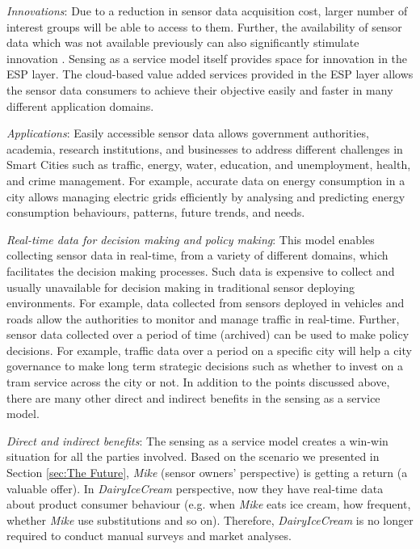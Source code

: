 \documentclass[times]{ettauth}
\begin{document}
\item  \textit{Innovations}: Due to a reduction in sensor data acquisition cost, larger number of interest groups will be able to access to them. Further, the availability of sensor data which was not available previously can also significantly stimulate innovation . Sensing as a service model itself provides space for innovation in the ESP layer. The cloud-based value added services provided in the ESP layer allows the sensor data consumers to achieve their objective easily and faster in many different application domains. 



\item  \textit{Applications}: Easily accessible sensor data allows government authorities, academia, research institutions, and businesses to address different challenges in Smart Cities such as traffic, energy, water, education, and unemployment, health, and crime management. For example, accurate data on energy consumption in a city allows managing electric grids efficiently by analysing and predicting energy consumption behaviours, patterns, future trends, and needs.


\item  \textit{Real-time data for decision making and policy making}: This model enables collecting sensor data in real-time, from a variety of different domains, which facilitates the decision making processes. Such data is expensive to collect and usually unavailable for decision making in traditional sensor deploying environments. For example, data collected from sensors deployed in vehicles and roads allow the authorities to monitor and manage traffic in real-time. Further, sensor data collected over a period of time (archived) can be used to make policy decisions. For example, traffic data over a period on a specific city will help a city governance to make long term strategic decisions such as whether to invest on a tram service across the city or not. In addition to the points discussed above, there are many other direct and indirect benefits in the sensing as a service model.


\item  \textit{Direct and indirect benefits}: The sensing as a service model creates a win-win situation for all the parties involved. Based on the scenario we presented in Section \ref{sec:The Future}, \textit{Mike} (sensor owners' perspective) is getting a return (a valuable offer). In \textit{DairyIceCream}  perspective, now they have real-time data about product consumer behaviour (e.g. when \textit{Mike} eats ice cream, how frequent, whether \textit{Mike} use substitutions and so on). Therefore, \textit{DairyIceCream} is no longer required to conduct manual surveys and market analyses. 
\end{document}
